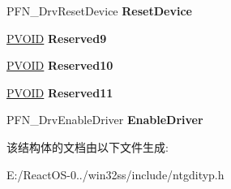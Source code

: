 \begin{DoxyCompactItemize}
\item 
\mbox{\label{struct___d_r_i_v_e_r___f_u_n_c_t_i_o_n_s_a885400ead5f24e1323ab03be3ed20eac}} 
P\+F\+N\+\_\+\+Drv\+Reset\+Device {\bfseries Reset\+Device}
\item 
\mbox{\label{struct___d_r_i_v_e_r___f_u_n_c_t_i_o_n_s_a943359287cddf15062796b94a6abd7cd}} 
\hyperlink{interfacevoid}{P\+V\+O\+ID} {\bfseries Reserved9}
\item 
\mbox{\label{struct___d_r_i_v_e_r___f_u_n_c_t_i_o_n_s_aefe5752d48c155b1fb63e497e3b017e9}} 
\hyperlink{interfacevoid}{P\+V\+O\+ID} {\bfseries Reserved10}
\item 
\mbox{\label{struct___d_r_i_v_e_r___f_u_n_c_t_i_o_n_s_ae4c97ac29531d7d55c4d1a864b42371b}} 
\hyperlink{interfacevoid}{P\+V\+O\+ID} {\bfseries Reserved11}
\item 
\mbox{\label{struct___d_r_i_v_e_r___f_u_n_c_t_i_o_n_s_a62d4b4142889d30110b64d7ba950f8c4}} 
P\+F\+N\+\_\+\+Drv\+Enable\+Driver {\bfseries Enable\+Driver}
\end{DoxyCompactItemize}


该结构体的文档由以下文件生成\+:\begin{DoxyCompactItemize}
\item 
E\+:/\+React\+O\+S-\/0../win32ss/include/ntgdityp.\+h\end{DoxyCompactItemize}
